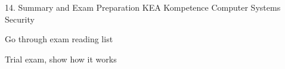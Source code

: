 \documentclass[Screen16to9,17pt]{foils}
\begin{document}
\mytitlepage
{14. Summary and Exam Preparation}
{KEA Kompetence Computer Systems Security \the\year}




\begin{list1}
\item Go through exam reading list
\item Trial exam, show how it works
\end{list1}
\end{document}
